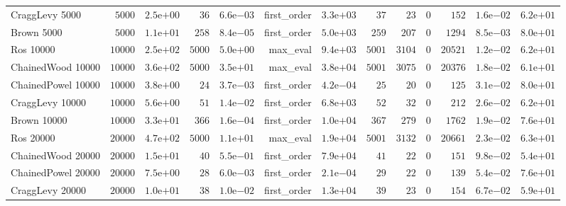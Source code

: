 \begin{longtable}[c]{lrrrrrrrrrrrr}
CraggLevy 5000 & \( 5000\) & \( 2.5\)e\(+00\) & \(   36\) & \( 6.6\)e\(-03\) & first\_order & \( 3.3\)e\(+03\) & \(   37\) & \(   23\) & \(    0\) & \(  152\) & \( 1.6\)e\(-02\) & \( 6.2\)e\(+01\) \\
Brown 5000 & \( 5000\) & \( 1.1\)e\(+01\) & \(  258\) & \( 8.4\)e\(-05\) & first\_order & \( 5.0\)e\(+03\) & \(  259\) & \(  207\) & \(    0\) & \( 1294\) & \( 8.5\)e\(-03\) & \( 8.0\)e\(+01\) \\
Ros 10000 & \(10000\) & \( 2.5\)e\(+02\) & \( 5000\) & \( 5.0\)e\(+00\) & max\_eval & \( 9.4\)e\(+03\) & \( 5001\) & \( 3104\) & \(    0\) & \(20521\) & \( 1.2\)e\(-02\) & \( 6.2\)e\(+01\) \\
ChainedWood 10000 & \(10000\) & \( 3.6\)e\(+02\) & \( 5000\) & \( 3.5\)e\(+01\) & max\_eval & \( 3.8\)e\(+04\) & \( 5001\) & \( 3075\) & \(    0\) & \(20376\) & \( 1.8\)e\(-02\) & \( 6.1\)e\(+01\) \\
ChainedPowel 10000 & \(10000\) & \( 3.8\)e\(+00\) & \(   24\) & \( 3.7\)e\(-03\) & first\_order & \( 4.2\)e\(-04\) & \(   25\) & \(   20\) & \(    0\) & \(  125\) & \( 3.1\)e\(-02\) & \( 8.0\)e\(+01\) \\
CraggLevy 10000 & \(10000\) & \( 5.6\)e\(+00\) & \(   51\) & \( 1.4\)e\(-02\) & first\_order & \( 6.8\)e\(+03\) & \(   52\) & \(   32\) & \(    0\) & \(  212\) & \( 2.6\)e\(-02\) & \( 6.2\)e\(+01\) \\
Brown 10000 & \(10000\) & \( 3.3\)e\(+01\) & \(  366\) & \( 1.6\)e\(-04\) & first\_order & \( 1.0\)e\(+04\) & \(  367\) & \(  279\) & \(    0\) & \( 1762\) & \( 1.9\)e\(-02\) & \( 7.6\)e\(+01\) \\
Ros 20000 & \(20000\) & \( 4.7\)e\(+02\) & \( 5000\) & \( 1.1\)e\(+01\) & max\_eval & \( 1.9\)e\(+04\) & \( 5001\) & \( 3132\) & \(    0\) & \(20661\) & \( 2.3\)e\(-02\) & \( 6.3\)e\(+01\) \\
ChainedWood 20000 & \(20000\) & \( 1.5\)e\(+01\) & \(   40\) & \( 5.5\)e\(-01\) & first\_order & \( 7.9\)e\(+04\) & \(   41\) & \(   22\) & \(    0\) & \(  151\) & \( 9.8\)e\(-02\) & \( 5.4\)e\(+01\) \\
ChainedPowel 20000 & \(20000\) & \( 7.5\)e\(+00\) & \(   28\) & \( 6.0\)e\(-03\) & first\_order & \( 2.1\)e\(-04\) & \(   29\) & \(   22\) & \(    0\) & \(  139\) & \( 5.4\)e\(-02\) & \( 7.6\)e\(+01\) \\
CraggLevy 20000 & \(20000\) & \( 1.0\)e\(+01\) & \(   38\) & \( 1.0\)e\(-02\) & first\_order & \( 1.3\)e\(+04\) & \(   39\) & \(   23\) & \(    0\) & \(  154\) & \( 6.7\)e\(-02\) & \( 5.9\)e\(+01\) \\

\end{longtable}
